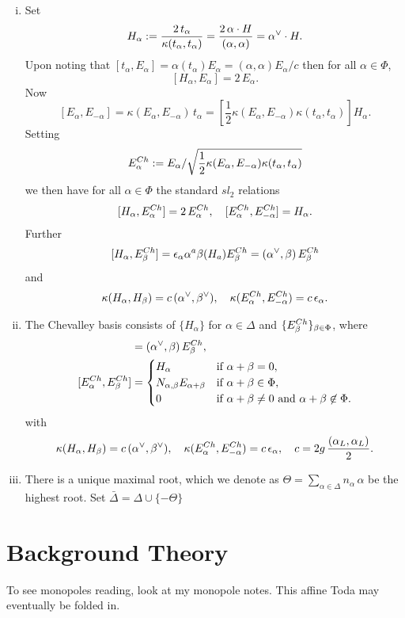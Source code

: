 \documentclass{article}
\begin{document}
\begin{enumerate}[(i)]
	\item Set
	$$H_\alpha:=\frac{2\,t_\alpha}{\kappa(t_\alpha,t_\alpha)}=\frac{2\,\alpha\cdot H}{(\alpha,\alpha)}
	=\alpha\sp\vee\cdot H.
	$$
	Upon noting that $[t_\alpha, E_\alpha]=\alpha(t_\alpha)E_\alpha=(\alpha,\alpha)E_\alpha/{c}$
	then for all $\alpha\in\Phi$,
	$$[H_\alpha, E_\alpha]=2\,E_\alpha.
	$$
	Now
	$$ [E_\alpha,E_{-\alpha}]=\kappa(E_\alpha,E_{-\alpha})\,t_\alpha=
	\left[\frac12 \kappa(E_\alpha,E_{-\alpha}) \kappa(t_\alpha,t_\alpha) \right] H_\alpha.
	$$
	Setting
	$$E_\alpha\sp{Ch}:=E_\alpha/\sqrt{\frac12 \kappa(E_\alpha,E_{-\alpha}) \kappa(t_\alpha,t_\alpha) }$$
	we then have for  all $\alpha\in\Phi$ the standard $sl_2$ relations
	$$[H_\alpha, E_\alpha\sp{Ch}]=2\,E_\alpha\sp{Ch},\quad [E_\alpha\sp{Ch},E_{-\alpha}\sp{Ch}]=H_\alpha.
	$$
	Further
	$$[H_\alpha, E_\beta\sp{Ch}]=\epsilon_\alpha \alpha\sp{a} \beta(H_a) E_\beta\sp{Ch}=
	(\alpha\sp\vee,\beta)\, E_\beta\sp{Ch}
	$$
	and
	$$\kappa(H_\alpha,H_\beta)=c\,(\alpha\sp\vee,\beta\sp\vee),\quad
	\kappa(E_\alpha\sp{Ch},E_{-\alpha}\sp{Ch})=c\,\epsilon_\alpha.
	$$
	
	
	\item The Chevalley basis consists of
	$\{H_\alpha\}$ for $\alpha\in\Delta$ and $\{E_\beta\sp{Ch}\}_{\beta\in\Phi}$, 
	where
	\begin{align*} 
	[H_\alpha, E_\beta\sp{Ch}]&=(\alpha\sp\vee,\beta)\, E_\beta\sp{Ch},\\
	[E_\alpha\sp{Ch},E_\beta\sp{Ch}]&=
	\begin{cases} H_\alpha
	&\text{if }\alpha+\beta=0,\\
	N_{\alpha,\beta}E_{\alpha+\beta}&\text{if }\alpha+\beta\in\Phi,\\
	0&\text{if }\alpha+\beta\ne0\text{ and }\alpha+\beta\not\in\Phi.
	\end{cases}
	\end{align*}
	with
	$$\kappa(H_\alpha,H_\beta)=c\,(\alpha\sp\vee,\beta\sp\vee),\quad
	\kappa(E_\alpha\sp{Ch},E_{-\alpha}\sp{Ch})=c\,\epsilon_\alpha, \quad
	c=2g\, \frac{(\alpha_L,\alpha_L)}{2}.
	$$
	\item There is a unique maximal root, which we denote as $\Theta=\sum_{\alpha\in\Delta} {n_\alpha}\, \alpha$ be the highest root. Set 
	$\bar\Delta=\Delta\cup\{-\Theta\}$
\end{enumerate}
\section{Background Theory}
To see monopoles reading, look at my monopole notes. This affine Toda may eventually be folded in. 
\end{document}
